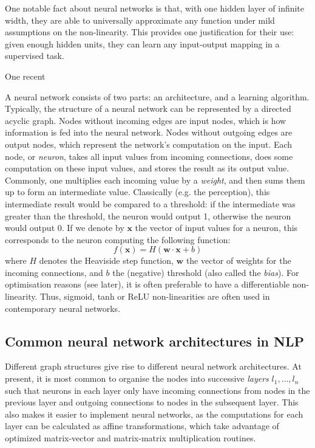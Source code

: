 One notable fact about neural networks is that, with one hidden layer of infinite width, they are able to universally approximate any function \citep{Cybenko:89,Hornik:91} under mild assumptions on the non-linearity. This provides one justification for their use: given enough hidden units, they can learn any input-output mapping in a supervised task.

One recent 

A neural network consists of two parts: an architecture, and a learning algorithm. Typically, the structure of a neural network can be represented by a directed acyclic graph. Nodes without incoming edges are input nodes, which is how information is fed into the neural network. Nodes without outgoing edges are output nodes, which represent the network's computation on the input. Each node, or \textit{neuron}, takes all input values from incoming connections, does some computation on these input values, and stores the result as its output value. Commonly, one multiplies each incoming value by a \textit{weight}, and then sums them up to form an intermediate value. Classically (e.g. the perception), this intermediate result would be compared to a threshold: if the intermediate was greater than the threshold, the neuron would output 1, otherwise the neuron would output 0. If we denote by $\mathbf{x}$ the vector of input values for a neuron, this corresponds to the neuron computing the following function:
\begin{equation}
    f(\mathbf{x}) = H(\mathbf{w} \cdot \mathbf{x} + b)
\end{equation}
where $H$ denotes the Heaviside step function, $\mathbf{w}$ the vector of weights for the incoming connections, and $b$ the (negative) threshold (also called the \textit{bias}). For optimisation reasons (see later), it is often preferable to have a differentiable non-linearity. Thus, sigmoid, tanh or ReLU non-linearities are often used in contemporary neural networks.

\subsection{Common neural network architectures in NLP}

Different graph structures give rise to different neural network architectures. At present, it is most common to organise the nodes into successive \textit{layers} $l_1, \dots, l_n$ such that neurons in each layer only have incoming connections from nodes in the previous layer and outgoing connections to nodes in the subsequent layer. This also makes it easier to implement neural networks, as the computations for each layer can be calculated as affine transformations, which take advantage of optimized matrix-vector and matrix-matrix multiplication routines.

